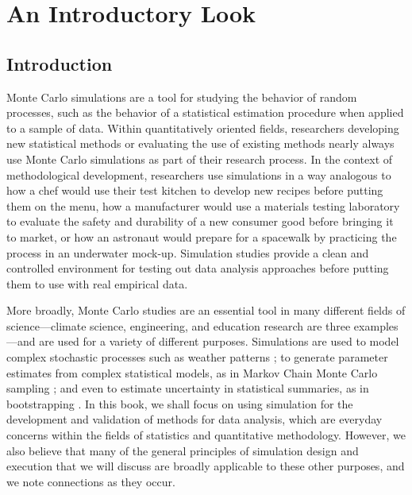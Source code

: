 \documentclass[
]{book}
\begin{document}
\part{An Introductory Look}\label{part-an-introductory-look}

\chapter{Introduction}\label{introduction}

Monte Carlo simulations are a tool for studying the behavior of random processes, such as the behavior of a statistical estimation procedure when applied to a sample of data.
Within quantitatively oriented fields, researchers developing new statistical methods or evaluating the use of existing methods nearly always use Monte Carlo simulations as part of their research process.
In the context of methodological development, researchers use simulations in a way analogous to how a chef would use their test kitchen to develop new recipes before putting them on the menu, how a manufacturer would use a materials testing laboratory to evaluate the safety and durability of a new consumer good before bringing it to market, or how an astronaut would prepare for a spacewalk by practicing the process in an underwater mock-up.
Simulation studies provide a clean and controlled environment for testing out data analysis approaches before putting them to use with real empirical data.

More broadly, Monte Carlo studies are an essential tool in many different fields of science---climate science, engineering, and education research are three examples---and are used for a variety of different purposes.
Simulations are used to model complex stochastic processes such as weather patterns \citep{jones2012IntroductionScientificProgramming, robert2010IntroducingMonteCarlo};
to generate parameter estimates from complex statistical models, as in Markov Chain Monte Carlo sampling \citep{gelman2013BayesianDataAnalysis};
and even to estimate uncertainty in statistical summaries, as in bootstrapping \citep{davison1997BootstrapMethodsTheir}.
In this book, we shall focus on using simulation for the development and validation of methods for data analysis, which are everyday concerns within the fields of statistics and quantitative methodology.
However, we also believe that many of the general principles of simulation design and execution that we will discuss are broadly applicable to these other purposes, and we note connections as they occur.
\end{document}
